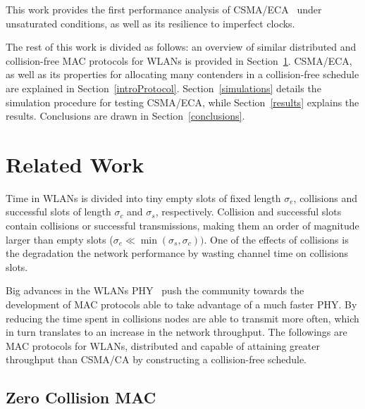 \documentclass[a4paper,journal]{IEEEtran}
\begin{document}
This work provides the first performance analysis of CSMA/ECA~\cite{research2standards} under unsaturated conditions, as well as its resilience to imperfect clocks.


The rest of this work is divided as follows: an overview of similar distributed and collision-free MAC protocols for WLANs is provided in  Section~\ref{relatedWork}. CSMA/ECA, as well as its properties for allocating many contenders in a collision-free schedule are explained in Section~\ref{introProtocol}. Section~\ref{simulations} details the simulation procedure for testing CSMA/ECA, while Section~\ref{results} explains the results. Conclusions are drawn in Section~\ref{conclusions}.




\section{Related Work}\label{relatedWork}
Time in WLANs is divided into tiny empty slots of fixed length $\sigma_{e}$, collisions and successful slots of length $\sigma_{c}$ and $\sigma_{s}$, respectively. Collision and successful slots contain collisions or successful transmissions, making them an order of magnitude larger than empty slots ($\sigma_{e}\ll\min(\sigma_{s},\sigma_{c}))$. One of the effects of collisions is the degradation the network performance by wasting channel time on collisions slots. 

Big advances in the WLANs PHY~\cite{perahia2008ieee,6191306} push the community towards the development of MAC protocols able to take advantage of a much faster PHY. By reducing the time spent in collisions nodes are able to transmit more often, which in turn translates to an increase in the network throughput. The followings are MAC protocols for WLANs, distributed and capable of attaining greater throughput than CSMA/CA by constructing a collision-free schedule.

\subsection{Zero Collision MAC} 
\end{document}
